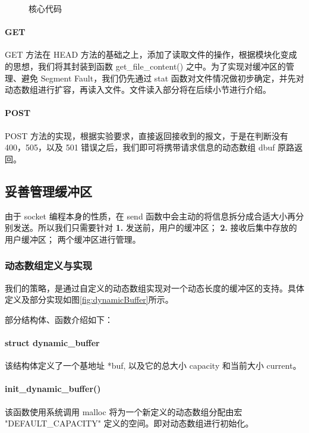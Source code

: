 \begin{figure}[htbp!]
    \centering
    \caption{核心代码}\label{fig:Main}
\end{figure}

\paragraph*{GET} GET 方法在 HEAD 方法的基础之上，添加了读取文件的操作，根据模块化变成的思想，我们将其封装到函数 get\_file\_content() 之中。为了实现对缓冲区的管理、避免 Segment Fault，我们仍先通过 stat 函数对文件情况做初步确定，并先对动态数组进行扩容，再读入文件。文件读入部分将在后续小节进行介绍。

\paragraph*{POST} POST 方法的实现，根据实验要求，直接返回接收到的报文，于是在判断没有 400，505，以及 501 错误之后，我们即可将携带请求信息的动态数组 dbuf 原路返回。

\subsection{妥善管理缓冲区}

由于 socket 编程本身的性质，在 send 函数中会主动的将信息拆分成合适大小再分别发送。所以我们只需要针对 \textbf{1.} 发送前，用户的缓冲区； \textbf{2.} 接收后集中存放的用户缓冲区； 两个缓冲区进行管理。

\subsubsection{动态数组定义与实现}
我们的策略，是通过自定义的动态数组实现对一个动态长度的缓冲区的支持。具体定义及部分实现如图\ref{fig:dynamicBuffer}所示。


部分结构体、函数介绍如下：

\paragraph*{struct dynamic\_buffer} 该结构体定义了一个基地址 *buf, 以及它的总大小 capacity 和当前大小 current。

\paragraph*{init\_dynamic\_buffer()} 该函数使用系统调用 malloc 将为一个新定义的动态数组分配由宏 "DEFAULT\_CAPACITY" 定义的空间。即对动态数组进行初始化。

